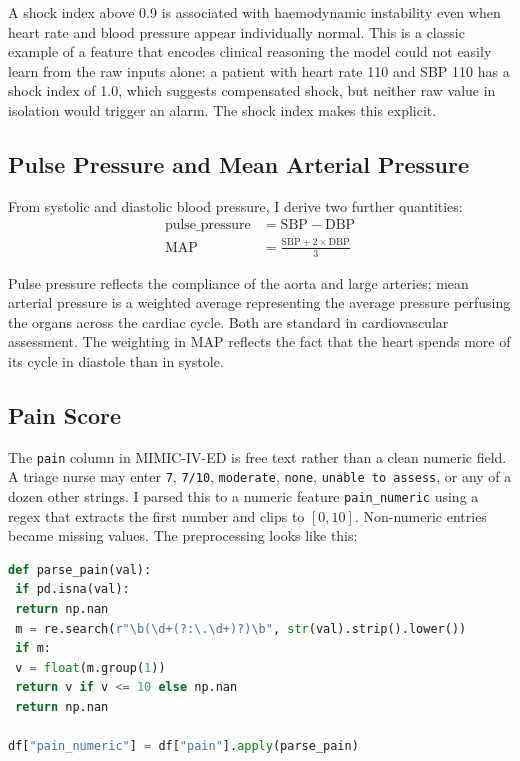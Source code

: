 A shock index above 0.9 is associated with haemodynamic instability even when heart rate and blood pressure appear individually normal. This is a classic example of a feature that encodes clinical reasoning the model could not easily learn from the raw inputs alone: a patient with heart rate 110 and SBP 110 has a shock index of 1.0, which suggests compensated shock, but neither raw value in isolation would trigger an alarm. The shock index makes this explicit.

\subsection*{Pulse Pressure and Mean Arterial Pressure}

From systolic and diastolic blood pressure, I derive two further quantities:
\begin{align*}
\text{pulse\_pressure} &= \text{SBP} - \text{DBP} \\
\text{MAP} &= \frac{\text{SBP} + 2 \times \text{DBP}}{3}
\end{align*}

Pulse pressure reflects the compliance of the aorta and large arteries; mean arterial pressure is a weighted average representing the average pressure perfusing the organs across the cardiac cycle. Both are standard in cardiovascular assessment. The weighting in MAP reflects the fact that the heart spends more of its cycle in diastole than in systole.

\subsection*{Pain Score}

The \texttt{pain} column in MIMIC-IV-ED is free text rather than a clean numeric field. A triage nurse may enter \texttt{7}, \texttt{7/10}, \texttt{moderate}, \texttt{none}, \texttt{unable to assess}, or any of a dozen other strings. I parsed this to a numeric feature \texttt{pain\_numeric} using a regex that extracts the first number and clips to $[0, 10]$. Non-numeric entries became missing values. The preprocessing looks like this:

\begin{lstlisting}[language=Python, caption={Pain score parsing. The regex handles formats like ``7'', ``7/10'', and ``pain 8''. Values outside the 0--10 scale, including text-only entries, become missing.}]
def parse_pain(val):
 if pd.isna(val):
 return np.nan
 m = re.search(r"\b(\d+(?:\.\d+)?)\b", str(val).strip().lower())
 if m:
 v = float(m.group(1))
 return v if v <= 10 else np.nan
 return np.nan

df["pain_numeric"] = df["pain"].apply(parse_pain)
\end{lstlisting}

